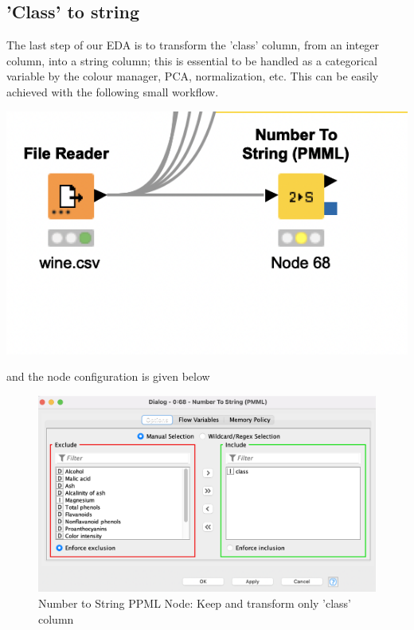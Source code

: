 \documentclass[11pt]{article}
\begin{document}
		\subsection*{'Class' to  string}
			The last step of our EDA is to transform the 'class' column, from an integer column, into a string column; this is essential to be handled as a categorical variable by the colour manager, PCA, normalization, etc. This can be easily achieved with the following small workflow.
			\iftrue
			\begin{center}
				\includegraphics[scale=0.5]{res/t0/t04/t04-workflow}
			\end{center}
			\fi
			and the node configuration is given below
			\iftrue
			\begin{figure}[H]
				\centering
				\includegraphics[scale=0.3]{res/t0/t04/t04-number-to-string-ppml-conf}
				\caption{Number to String PPML Node: Keep and transform only 'class' column}
				\label{fig:second}
			\end{figure}
			\fi
\end{document}
